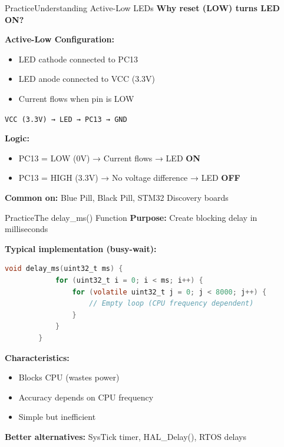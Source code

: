 \documentclass{beamer}
\begin{document}
\begin{frame}{Practice}{Understanding Active-Low LEDs}
	\textbf{Why reset (LOW) turns LED ON?}
	
	\medskip
	\textbf{Active-Low Configuration:}
	\begin{itemize}
		\item LED cathode connected to PC13
		\item LED anode connected to VCC (3.3V)
		\item Current flows when pin is LOW
	\end{itemize}
	
	\begin{center}
		\texttt{VCC (3.3V) → LED → PC13 → GND}
	\end{center}
	
	\medskip
	\textbf{Logic:}
	\begin{itemize}
		\item PC13 = LOW (0V) → Current flows → LED \textbf{ON}
		\item PC13 = HIGH (3.3V) → No voltage difference → LED \textbf{OFF}
	\end{itemize}
	
	\medskip
	\textbf{Common on:} Blue Pill, Black Pill, STM32 Discovery boards
\end{frame}
\begin{frame}[fragile]{Practice}{The delay\_ms() Function}
	\textbf{Purpose:} Create blocking delay in milliseconds
	
	\medskip
	\textbf{Typical implementation (busy-wait):}
	\begin{lstlisting}[language=C, basicstyle=\ttfamily\footnotesize]
		void delay_ms(uint32_t ms) {
			for (uint32_t i = 0; i < ms; i++) {
				for (volatile uint32_t j = 0; j < 8000; j++) {
					// Empty loop (CPU frequency dependent)
				}
			}
		}
	\end{lstlisting}
	
	\textbf{Characteristics:}
	\begin{itemize}
		\item Blocks CPU (wastes power)
		\item Accuracy depends on CPU frequency
		\item Simple but inefficient
	\end{itemize}
	
	\textbf{Better alternatives:} SysTick timer, HAL\_Delay(), RTOS delays
\end{frame}
\end{document}
